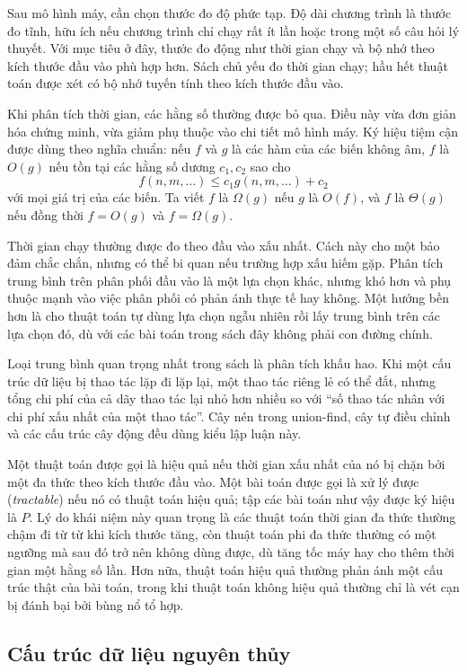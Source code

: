 \documentclass[11pt]{article}
\begin{document}
Sau mô hình máy, cần chọn thước đo độ phức tạp. Độ dài chương trình là thước
đo tĩnh, hữu ích nếu chương trình chỉ chạy rất ít lần hoặc trong một số câu hỏi
lý thuyết. Với mục tiêu ở đây, thước đo động như thời gian chạy và bộ nhớ theo
kích thước đầu vào phù hợp hơn. Sách chủ yếu đo thời gian chạy; hầu hết thuật
toán được xét có bộ nhớ tuyến tính theo kích thước đầu vào.

Khi phân tích thời gian, các hằng số thường được bỏ qua. Điều này vừa đơn giản
hóa chứng minh, vừa giảm phụ thuộc vào chi tiết mô hình máy. Ký hiệu tiệm cận
được dùng theo nghĩa chuẩn: nếu \(f\) và \(g\) là các hàm của các biến không âm,
\(f\) là \(O(g)\) nếu tồn tại các hằng số dương \(c_1,c_2\) sao cho
\[
  f(n,m,\ldots) \le c_1 g(n,m,\ldots) + c_2
\]
với mọi giá trị của các biến. Ta viết \(f\) là \(\Omega(g)\) nếu \(g\) là
\(O(f)\), và \(f\) là \(\Theta(g)\) nếu đồng thời \(f=O(g)\) và
\(f=\Omega(g)\).

Thời gian chạy thường được đo theo đầu vào xấu nhất. Cách này cho một bảo đảm
chắc chắn, nhưng có thể bi quan nếu trường hợp xấu hiếm gặp. Phân tích trung
bình trên phân phối đầu vào là một lựa chọn khác, nhưng khó hơn và phụ thuộc
mạnh vào việc phân phối có phản ánh thực tế hay không. Một hướng bền hơn là cho
thuật toán tự dùng lựa chọn ngẫu nhiên rồi lấy trung bình trên các lựa chọn đó,
dù với các bài toán trong sách đây không phải con đường chính.

Loại trung bình quan trọng nhất trong sách là phân tích khấu hao. Khi một cấu
trúc dữ liệu bị thao tác lặp đi lặp lại, một thao tác riêng lẻ có thể đắt, nhưng
tổng chi phí của cả dãy thao tác lại nhỏ hơn nhiều so với ``số thao tác nhân
với chi phí xấu nhất của một thao tác''. Cây nén trong union-find, cây tự điều
chỉnh và các cấu trúc cây động đều dùng kiểu lập luận này.

Một thuật toán được gọi là hiệu quả nếu thời gian xấu nhất của nó bị chặn bởi
một đa thức theo kích thước đầu vào. Một bài toán được gọi là xử lý được
(\emph{tractable}) nếu nó có thuật toán hiệu quả; tập các bài toán như vậy được
ký hiệu là \(P\). Lý do khái niệm này quan trọng là các thuật toán thời gian đa
thức thường chậm đi từ từ khi kích thước tăng, còn thuật toán phi đa thức
thường có một ngưỡng mà sau đó trở nên không dùng được, dù tăng tốc máy hay cho
thêm thời gian một hằng số lần. Hơn nữa, thuật toán hiệu quả thường phản ánh
một cấu trúc thật của bài toán, trong khi thuật toán không hiệu quả thường chỉ
là vét cạn bị đánh bại bởi bùng nổ tổ hợp.

\subsection*{Cấu trúc dữ liệu nguyên thủy}
\end{document}
